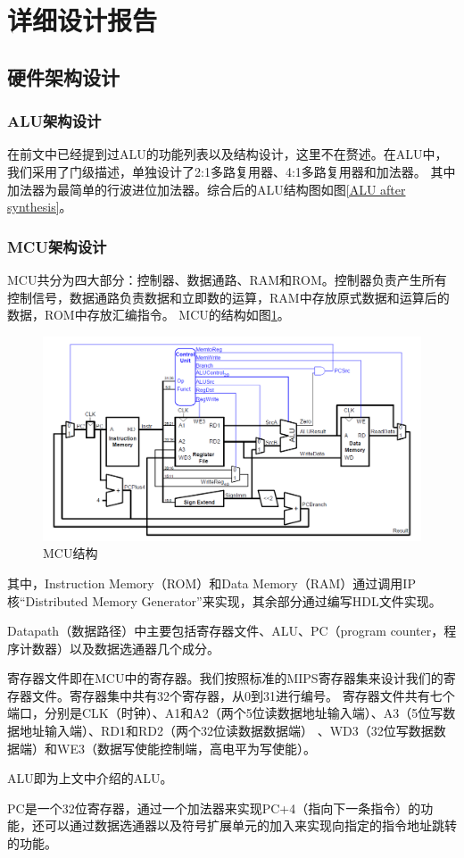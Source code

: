 \documentclass[a4paper]{article}
\begin{document}
	\section{详细设计报告}
		\subsection{硬件架构设计}
			\subsubsection{ALU架构设计}
				在前文中已经提到过ALU的功能列表以及结构设计，这里不在赘述。在ALU中，我们采用了门级描述，单独设计了2:1多路复用器、4:1多路复用器和加法器。
				其中加法器为最简单的行波进位加法器。综合后的ALU结构图如图\ref{ALU after synthesis}。
				
			\subsubsection{MCU架构设计}
				MCU共分为四大部分：控制器、数据通路、RAM和ROM。控制器负责产生所有控制信号，数据通路负责数据和立即数的运算，RAM中存放原式数据和运算后的数据，ROM中存放汇编指令。
				MCU的结构如图\ref{MCU structure}。
				\begin{figure}[htbp]
					\centering
					\includegraphics[scale=0.5]{MCU结构.png}
					\caption{MCU结构}
					\label{MCU structure}
				\end{figure}
				其中，Instruction Memory（ROM）和Data Memory（RAM）通过调用IP核“Distributed Memory Generator”来实现，其余部分通过编写HDL文件实现。\par

				Datapath（数据路径）中主要包括寄存器文件、ALU、PC（program counter，程序计数器）以及数据选通器几个成分。\par
				寄存器文件即在MCU中的寄存器。我们按照标准的MIPS寄存器集来设计我们的寄存器文件。寄存器集中共有32个寄存器，从0到31进行编号。
				寄存器文件共有七个端口，分别是CLK（时钟）、A1和A2（两个5位读数据地址输入端）、A3（5位写数据地址输入端）、RD1和RD2（两个32位读数据数据端）
				、WD3（32位写数据数据端）和WE3（数据写使能控制端，高电平为写使能）。\par
				ALU即为上文中介绍的ALU。\par
				PC是一个32位寄存器，通过一个加法器来实现PC+4（指向下一条指令）的功能，还可以通过数据选通器以及符号扩展单元的加入来实现向指定的指令地址跳转的功能。\par
\end{document}
